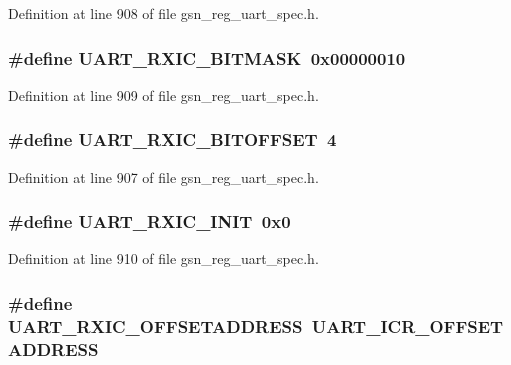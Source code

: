 Definition at line 908 of file gsn\_\-reg\_\-uart\_\-spec.h.

\hypertarget{a00575_a6a377bbc0386ce2bc076be001beef6b9}{
\subsubsection[{UART\_\-RXIC\_\-BITMASK}]{\setlength{\rightskip}{0pt plus 5cm}\#define UART\_\-RXIC\_\-BITMASK~0x00000010}}
\label{a00575_a6a377bbc0386ce2bc076be001beef6b9}


Definition at line 909 of file gsn\_\-reg\_\-uart\_\-spec.h.

\hypertarget{a00575_a4f590ee7ad89ace34ad6705a228ad994}{
\subsubsection[{UART\_\-RXIC\_\-BITOFFSET}]{\setlength{\rightskip}{0pt plus 5cm}\#define UART\_\-RXIC\_\-BITOFFSET~4}}
\label{a00575_a4f590ee7ad89ace34ad6705a228ad994}


Definition at line 907 of file gsn\_\-reg\_\-uart\_\-spec.h.

\hypertarget{a00575_a12fb7472f37d5e3dd018b8ad03751fd3}{
\subsubsection[{UART\_\-RXIC\_\-INIT}]{\setlength{\rightskip}{0pt plus 5cm}\#define UART\_\-RXIC\_\-INIT~0x0}}
\label{a00575_a12fb7472f37d5e3dd018b8ad03751fd3}


Definition at line 910 of file gsn\_\-reg\_\-uart\_\-spec.h.

\hypertarget{a00575_a782a5b2f7aa71ed8d4c54eca25228f1c}{
\subsubsection[{UART\_\-RXIC\_\-OFFSETADDRESS}]{\setlength{\rightskip}{0pt plus 5cm}\#define UART\_\-RXIC\_\-OFFSETADDRESS~UART\_\-ICR\_\-OFFSETADDRESS}}
\label{a00575_a782a5b2f7aa71ed8d4c54eca25228f1c}


